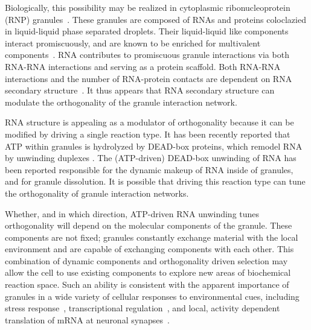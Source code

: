 Biologically, this possibility may be realized in cytoplasmic ribonucleoprotein (RNP) granules~\cite{Brangwynne2009}.  These granules are composed of RNAs and proteins coloclazied in liquid-liquid phase separated droplets.  Their liquid-liquid like components interact promiscuously, and are known to be enriched for multivalent components~\cite{Banani2017}.  RNA contributes to promiscuous granule interactions via both RNA-RNA interactions and serving as a protein scaffold.  Both RNA-RNA interactions and the number of RNA-protein contacts are dependent on RNA secondary structure~\cite{Groot2019}.  It thus appears that RNA secondary structure can modulate the orthogonality of the granule interaction network.

RNA structure is appealing as a modulator of orthogonality because it can be modified by driving a single reaction type.  It has been recently reported that ATP within granules is hydrolyzed by DEAD-box proteins, which remodel RNA by unwinding duplexes \cite{Hondele2019}.  The (ATP-driven) DEAD-box unwinding of RNA has been reported responsible for the dynamic makeup of RNA inside of granules, and for granule dissolution.  It is possible that driving this reaction type can tune the orthogonality of granule interaction networks.

Whether, and in which direction, ATP-driven RNA unwinding tunes orthogonality will depend on the molecular components of the granule.  These components are not fixed; granules constantly exchange material with the local environment and are capable of exchanging components with each other.  This combination of dynamic components and orthogonality driven selection may allow the cell to use existing components to explore new areas of biochemical reaction space.  Such an ability is consistent with the apparent importance of granules in a wide variety of cellular responses to environmental cues, including stress response~\cite{Buchan2009}, transcriptional regulation~\cite{Anderson2009}, and local, activity dependent translation of mRNA at neuronal synapses~\cite{McCann2011, Barbee2006}.